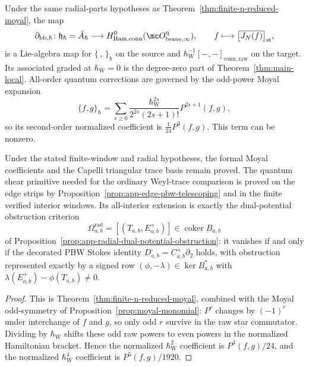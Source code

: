 \documentclass[11pt]{memoir}
\begin{document}
\begin{cor}\label{cor:degree-zero-quantum-comparison}
  Under the same radial-parts hypotheses as
  Theorem~\ref{thm:finite-n-reduced-moyal}, the map
  $$\partial_{\mathrm{bb},\hbar}\colon
    \mathfrak h_\hbar=\bar A_\hbar\longrightarrow
    H^0_{\mathrm{Ham,conn}}(\mc O^{\mathrm q}_{\mathrm{brane},\infty}),
    \qquad f\longmapsto
      \bigl[\overline{J_N(f)}\bigr]_{\mathrm{st}},$$
  is a Lie-algebra map for $\{\,,\,\}_\hbar$ on the source and
  \(\hbar_{\mathrm{W}}^{-1}[-,-]_{\mathrm{conn,raw}}\) on the target. Its associated
  graded at \(\hbar_{\mathrm{W}}=0\) is the degree-zero part of
  Theorem~\ref{thm:main-local}. All-order quantum corrections are
  governed by the odd-power Moyal expansion
  $$\{f,g\}_\hbar=
    \sum_{s\geq0}\frac{\hbar_{\mathrm{W}}^{2s}}{2^{2s}(2s+1)!}P^{2s+1}(f,g),$$
  so its second-order normalized coefficient is
  \(\frac1{24}P^3(f,g)\).  This term can be nonzero.

  Under the stated finite-window and radial hypotheses, the formal Moyal
  coefficients and the Capelli triangular trace basis remain proved.  The quantum
  shear primitive needed for the ordinary Weyl-trace comparison is
  proved on the edge strips by
  Proposition~\ref{prop:app-edge-pbw-telescoping} and in the finite
  verified interior windows.  Its all-interior extension is exactly the
  dual-potential obstruction criterion
  \[
    \Omega^{\mathrm{rad}}_{a,b}
      =
      [(T_{a,b},E^+_{a,b})]\in\operatorname{coker}B_{a,b}
  \]
  of Proposition~\ref{prop:app-radial-dual-potential-obstruction}:
  it vanishes if and only if the decorated PBW Stokes identity
  \(D^\square_{a,b}=C^+_{a,b}\partial_2\) holds, with obstruction represented
  exactly by a signed row
  \((\phi,-\lambda)\in\ker B_{a,b}^*\) with
  \(\lambda(E^+_{a,b})-\phi(T_{a,b})\ne0\).
\end{cor}

\begin{proof}
  This is Theorem~\ref{thm:finite-n-reduced-moyal}, combined with the
  Moyal odd-symmetry of Proposition~\ref{prop:moyal-monomial}: $P^r$
  changes by $(-1)^r$ under interchange of $f$ and $g$, so only odd $r$
  survive in the raw star commutator. Dividing by \(\hbar_{\mathrm{W}}\) shifts
  these odd raw powers to even powers in the normalized Hamiltonian
  bracket. Hence the normalized \(\hbar_{\mathrm{W}}^2\) coefficient is
  \(P^3(f,g)/24\), and the normalized \(\hbar_{\mathrm{W}}^4\) coefficient is
  \(P^5(f,g)/1920\).
\end{proof}
\end{document}
